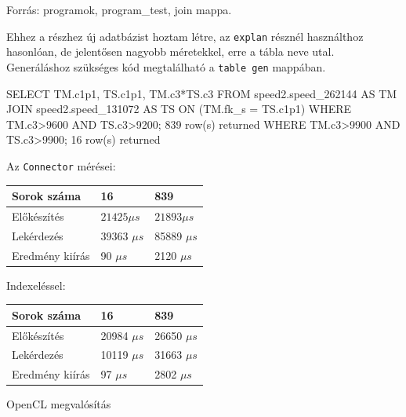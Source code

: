 Forrás: programok, program\_test, join mappa.

Ehhez a részhez új adatbázist hoztam létre, az \texttt{explan} résznél használthoz hasonlóan, de jelentősen nagyobb méretekkel, erre a tábla neve utal.
Generáláshoz szükséges kód megtalálható a \texttt{table gen} mappában.

\begin{python}
SELECT TM.c1p1, TS.c1p1, TM.c3*TS.c3 FROM speed2.speed_262144 AS TM 
JOIN speed2.speed_131072 AS TS ON (TM.fk_s = TS.c1p1) 
WHERE TM.c3>9600 AND TS.c3>9200; 
	839 row(s) returned
WHERE TM.c3>9900 AND TS.c3>9900; 
	16 row(s) returned
\end{python}

Az \texttt{Connector} mérései:

\begin{table}[h!]
\centering
\begin{tabular}{|p{6cm}|p{3cm}|p{3cm}|}
\hline
Sorok száma & 16 & 839 \\
\hline\hline

Előkészítés & $21425 \mu s$ & $21893 \mu s$ \\
\hline

Lekérdezés & 39363 $\mu s$ & 85889 $\mu s$ \\
\hline

Eredmény kiírás & 90 $\mu s$ & 2120 $\mu s$ \\
\hline

\end{tabular}
\end{table}

Indexeléssel:

\begin{table}[h!]
\centering
\begin{tabular}{|p{6cm}|p{3cm}|p{3cm}|}
\hline
Sorok száma & 16 & 839 \\
\hline
\hline

Előkészítés & 20984 $\mu s$ & 26650 $\mu s$ \\
\hline

Lekérdezés & 10119 $\mu s$ & 31663 $\mu s$ \\
\hline

Eredmény kiírás & 97 $\mu s$ & 2802 $\mu s$ \\
\hline

\end{tabular}
\end{table}

OpenCL megvalósítás

